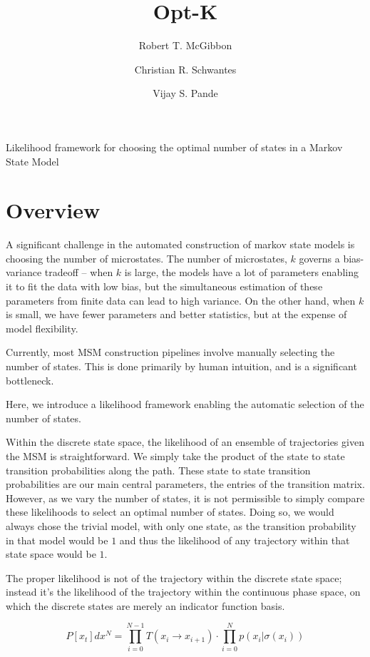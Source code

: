 \documentclass[twocolumn,floatfix,nofootinbib,aps]{revtex4-1}
\begin{document}
\title{Opt-K}
\author{Robert T. McGibbon}
\author{Christian R. Schwantes}
\author{Vijay S. Pande}
\maketitle

Likelihood framework for choosing the optimal number of states in a
Markov State Model

\section{Overview}

A significant challenge in the automated construction of markov state
models is choosing the number of microstates. The number of microstates,
$k$ governs a bias-variance tradeoff -- when $k$ is large, the models
have a lot of parameters enabling it to fit the data with low bias, but
the simultaneous estimation of these parameters from finite data can
lead to high variance. On the other hand, when $k$ is small, we have
fewer parameters and better statistics, but at the expense of model
flexibility.

Currently, most MSM construction pipelines involve manually selecting
the number of states. This is done primarily by human intuition, and is
a significant bottleneck.

Here, we introduce a likelihood framework enabling the automatic
selection of the number of states.

Within the discrete state space, the likelihood of an ensemble of
trajectories given the MSM is straightforward. We simply take the
product of the state to state transition probabilities along the path.
These state to state transition probabilities are our main central
parameters, the entries of the transition matrix. However, as we vary
the number of states, it is not permissible to simply compare these
likelihoods to select an optimal number of states. Doing so, we would
always chose the trivial model, with only one state, as the transition
probability in that model would be $1$ and thus the likelihood of any
trajectory within that state space would be $1$.

The proper likelihood is not of the trajectory within the discrete state
space; instead it's the likelihood of the trajectory within the
continuous phase space, on which the discrete states are merely an
indicator function basis. 

$$ 
P[x_t] dx^N = \prod_{i=0}^{N-1} T(x_i \rightarrow x_{i+1}) \cdot \prod_{i=0}^{N} p(x_{i} | \sigma(x_{i}))
$$
\end{document}
